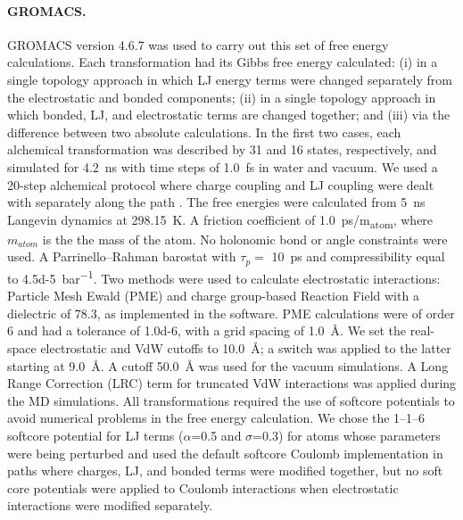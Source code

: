 \documentclass[journal=jctcce,manuscript=article]{achemso}
\begin{document}
{\paragraph{GROMACS.} 
GROMACS version 4.6.7 was used to carry out this set of free energy calculations. 
%
Each transformation had its Gibbs free energy calculated: 
(i) in a single topology approach in which LJ energy terms were changed separately from the electrostatic and bonded components; 
(ii) in a single topology approach in which bonded, LJ, and electrostatic terms are changed together; and 
(iii) via the difference between two absolute calculations.
In the first two cases, each alchemical transformation was described by 31 and 16 states, respectively, and simulated for \SI{4.2}{ns} with time steps of \SI{1.0}{fs} in water and vacuum. 
We used a 20-step alchemical protocol where charge coupling and LJ coupling were dealt with separately along the path \cite{Mobley2014, doi:10.1021/acs.jced.7b00104}.
%
The free energies were calculated from \SI{5}{ns} Langevin dynamics at \SI{298.15}{K}. 
A friction coefficient of \SI{1.0}{ps/m_{atom}}, where $m_{atom}$ is the the mass of the atom.  
No holonomic bond or angle constraints were used. 
A Parrinello--Rahman barostat with $\tau_p =$ \SI{10}{ps} and compressibility equal to \SI{4.5d-5}{bar^{-1}}.
%
Two methods were used to calculate electrostatic interactions: 
Particle Mesh Ewald (PME) and charge group-based Reaction Field with a dielectric of 78.3, as implemented in the software. 
PME calculations were of order 6 and had a tolerance of \num{1.0d-6}, with a grid spacing of \SI{1.0}{\angstrom}. 
We set the real-space electrostatic and VdW cutoffs to \SI{10.0}{\angstrom}; a switch was applied to the latter starting at \SI{9.0}{\angstrom}. 
A cutoff \SI{50.0}{\angstrom} was used for the vacuum simulations.
%
A Long Range Correction (LRC) term for truncated VdW interactions was applied during the MD simulations. 
%
All transformations required the use of softcore potentials to avoid numerical problems in the free energy calculation.  
We chose the 1--1--6 softcore potential for LJ terms ($\alpha$=0.5 and $\sigma$=0.3) for atoms whose parameters were being perturbed
and used the default softcore Coulomb implementation in paths where charges, LJ, and bonded terms were modified together, 
but no soft core potentials were applied to Coulomb interactions when electrostatic interactions were modified separately.  



}
\end{document}
